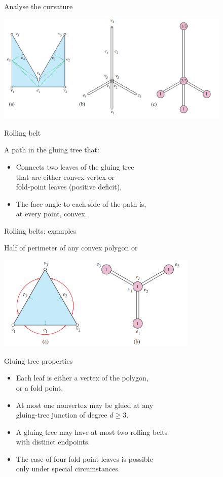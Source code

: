 \documentclass[17pt]{extarticle}
\newcommand{\newslide}[1]{\newpage \begin{center} \large #1
                          \end{center} \vspace{-5.5mm}}
\begin{document}
\newslide{Analyse the curvature}
\begin{center}
	\includegraphics[height=5.2cm]{minilec/gtreecurv}
\end{center}

\newslide{Rolling belt}

A path in the gluing tree that: \vspace{-5mm}

\begin{itemize}
	\item Connects two leaves of the gluing tree \\
		that are either convex-vertex or \\
		fold-point leaves (positive deficit),
	\item The face angle to each side of the path is, \\
		at every point, convex.
\end{itemize}

\newslide{Rolling belts: examples}

Half of perimeter of any convex polygon or

\begin{center}
	\includegraphics[height=4.5cm]{minilec/gtreerb}
\end{center}

\newslide{Gluing tree properties} \vspace{-5mm}

\begin{itemize}[itemsep=-3mm]
	\item Each leaf is either a vertex of the polygon, \\ or a fold point.
	\item At most one nonvertex may be glued at any \\ gluing-tree junction of degree \(d \ge 3\).
	\item A gluing tree may have at most two rolling belts \\ with distinct endpoints.
	\item The case of four fold-point leaves is possible \\ only under special circumstances.
\end{itemize}
\end{document}
